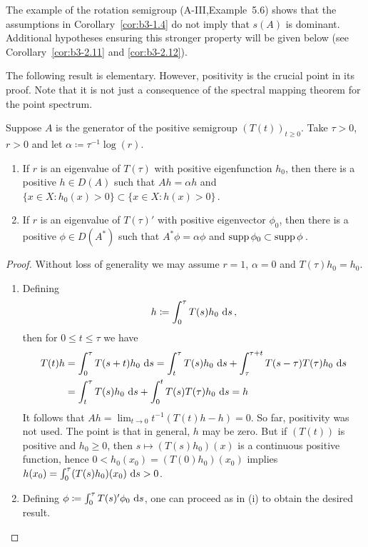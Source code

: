 The example of the rotation semigroup (A-III,Example~5.6) shows that the assumptions in Corollary~\ref{cor:b3-1.4} do not imply that $s(A)$ is dominant.
Additional hypotheses ensuring this stronger property will be given below (see Corollary~\ref{cor:b3-2.11} and \ref{cor:b3-2.12}).

The following result is elementary. 
However, positivity is the crucial point in its proof. 	
Note that it is not just a consequence of the spectral mapping theorem for the point spectrum.
\begin{proposition}\label{prop:b3-1.5}
Suppose $A$ is the generator of the positive semigroup $(T(t))_{t \geq 0}$.
Take $\tau > 0$, $r > 0$ and let $\alpha \coloneqq \tau^{-1}\log(r)$.
\begin{enumerate}[\upshape (i)]
\item 
If $r$ is an eigenvalue of $T(\tau)$ with positive eigenfunction $h_{0}$, then there is a positive $h \in D(A)$ such that $Ah = \alpha h$ and $\{x \in X \colon h_{0}(x) > 0\} \subset \{x \in X \colon h(x) > 0\}$\,.
		
\item 
If $r$ is an eigenvalue of $T(\tau)'$ with positive eigenvector $\phi_{0}$, then there is a positive $\phi \in D(A^*)$ such that $A^*\phi = \alpha\phi$ and $\mathop{}\!\mathrm{supp}\,\phi_{0} \subset \mathop{}\!\mathrm{supp}\,\phi$\,.
	\end{enumerate}
\end{proposition}
\begin{proof}
	Without loss of generality we may assume $r = 1$, \ie $\alpha = 0$ and $T(\tau)h_{0} = h_{0}$.
	\begin{enumerate}[\upshape (i), wide, labelindent=.5em]
    \item 
	Defining
	\begin{equation}\label{eq:b3-1.14}
		h \coloneqq \int_{0}^{\tau} T(s)h_{0} \, \mathop{}\!\mathrm{d}{s} \,,
	\end{equation}
	then for $0 \leq t \leq \tau$ we have
	\begin{align*}
		T(t)h &= \int_{0}^{\tau} T(s+t)h_{0} \, \mathop{}\!\mathrm{d}{s}  = \int_{t}^{\tau} T(s)h_{0} \, \mathop{}\!\mathrm{d}{s}  + \int_{\tau}^{\tau+t} T(s-\tau)T(\tau)h_{0} \, \mathop{}\!\mathrm{d}{s}  \\
		&= \int_{t}^{\tau} T(s)h_{0} \, \mathop{}\!\mathrm{d}{s}  + \int_{0}^{t} T(s)T(\tau)h_{0} \, \mathop{}\!\mathrm{d}{s}  = h
	\end{align*}
	It follows that $Ah = \lim_{t \to 0} t^{-1}(T(t)h - h) = 0$.
	So far, positivity was not used. 
    The point is that in general, $h$ may be zero.
	But if $(T(t))$ is positive and $h_{0} \geq 0$, then $s \mapsto (T(s)h_{0})(x)$ is a continuous positive function, hence $0 < h_{0}(x_{0}) = (T(0)h_{0})(x_{0})$ implies $h(x_{0}) = \int_{0}^{\tau} (T(s)h_{0})(x_{0}) \, \mathop{}\!\mathrm{d}{s}  > 0$.
	
	\item 
	Defining $\phi \coloneqq \int_{0}^{\tau} T(s)'\phi_{0} \, \mathop{}\!\mathrm{d}{s} $, one can proceed as in (i) to obtain the desired result.
	\end{enumerate}
\end{proof}
